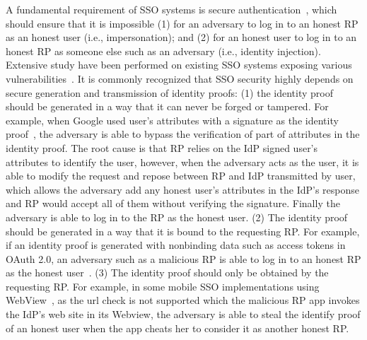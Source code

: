 A fundamental requirement of SSO systems is secure authentication~\cite{SPRESSO}, which should ensure that it is impossible (1) for an adversary to log in to an honest RP as an honest user (i.e., impersonation); and (2) for an honest user to log in to an honest RP as someone else such as an adversary (i.e., identity injection).
Extensive study have been performed on existing SSO systems exposing various vulnerabilities~\cite{ChenPCTKT14, FettKS16,WangCW12,ZhouE14,WangZLG16,YangLLZH16,SomorovskyMSKJ12,MohsenS16}. It is commonly recognized that SSO security highly depends on secure generation and transmission of identity proofs: (1) the identity proof should be generated in a way that it can never be forged or tampered. For example, when Google used user's attributes with a signature as the identity proof~\cite{WangCW12}, {\color{red}the adversary is able to bypass the verification of part of attributes in the identity proof. The root cause is that RP relies on the IdP signed user's attributes to identify the user, however, when the adversary acts as the user, it is able to modify the request and repose between RP and IdP transmitted by user, which allows the adversary add any honest user's attributes in the IdP's response and RP would accept all of them without verifying the signature. Finally the adversary is able to log in to the RP as the honest user}.
(2) The identity proof should be generated in a way that it is bound to the requesting RP. For example, if an identity proof is generated with nonbinding data such as access tokens in OAuth 2.0, an adversary such as a malicious RP is able to log in to an honest RP as the honest user~\cite{ChenPCTKT14, WangZLG16}.
(3) The identity proof should only be obtained by the requesting RP. For example, in some mobile SSO implementations using WebView~\cite{MohsenS16}, as the url check is not supported which the malicious RP app invokes the IdP's web site in its Webview, the adversary is able to steal the identify proof of an honest user when the app cheats her to consider it as another honest RP.

